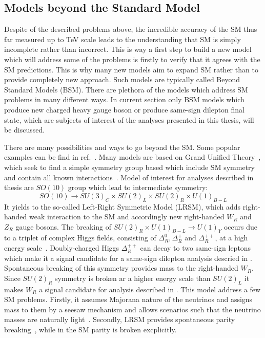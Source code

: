 \subsection{Models beyond the Standard Model}
\label{subsec:bsm_models}
Despite of the described problems above, the incredible accuracy of the SM thus far measured up to TeV scale leads to the understanding that SM 
is simply incomplete rather than incorrect. 
This is way a first step to build a new model which will address some of the problems is firstly to verify that it agrees with the SM predictions. 
This is why many new models aim to expand SM rather than to provide completely new approach. Such models are typically called Beyond Standard Models (BSM).
There are plethora of the models which address SM problems in many different ways. In current section only BSM models which produce new charged heavy gauge boson or produce same-sign dilepton final state, which are subjects of interest of the analyses presented in this thesis, will be discussed.

There are many possibilities and ways to go beyond the SM. 
Some popular examples can be find in ref.~\cite{Ellis:2011jb}.
Many models are based on Grand Unified Theory~\cite{GUT_bigPaper},
which seek to find a simple symmetry group based which include SM symmetry
and contain all known interactions~\cite{Langacker:1984dc,Cvetic:1995zs}.
Model of interest for analyses described in thesis are $SO(10)$ group
which lead to intermediate symmetry:
\begin{equation}
SO(10) \to SU(3)_C \times SU(2)_L \times SU(2)_R \times U(1)_{B-L}
\end{equation}
It yields to the so-called Left-Right Symmetric Model (LRSM), which adds
right-handed weak interaction to the SM and accordingly new right-handed $W_R$ and $Z_R$ gauge bosons.
The breaking of $SU(2)_R \times U(1)_{B-L} \to U(1)_Y$ occurs due to a triplet of complex Higgs fields, consisting of $\Delta^0_R, \Delta^+_R$ and $\Delta^{++}_R$, at a high energy scale~\cite{Azuelos:2004mwa}.
Doubly-charged Higgs $\Delta^{++}_R$ can decay to two same-sign leptons which make it a signal candidate for a same-sign dilepton analysis descried in . Spontaneous breaking of this symmetry provides mass to the right-handed $W_R$.
Since $SU(2)_R$ symmetry is broken ar a higher energy scale than $SU(2)_L$ it makes
$W_R$ a signal candidate for analysis described in .
This model address a few SM problems. Firstly, it assumes Majorana nature of the neutrinos and assigns mass to them by a seesaw mechanism and allows scenarios such that the neutrino masses are naturally light~\cite{Mohapatra:1979ia}. 
Secondly, LRSM provides spontaneous parity breaking~\cite{Grimus:1993fx}, while in the SM parity is broken excplicitly.

